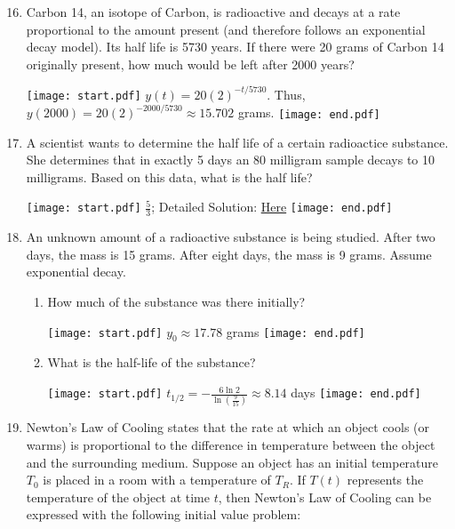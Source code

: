 \documentclass[12pt]{article}
\begin{document}
\begin{enumerate}
\setcounter{enumi}{15}

\item Carbon 14, an isotope of Carbon, is radioactive and decays at a rate proportional to the amount present (and therefore follows an exponential decay model).  Its half life is 5730 years.  If there were 20 grams of Carbon 14 originally present, how much would be left after 2000 years?

\texttt{[image: start.pdf]}
{{$y(t)=20(2)^{-t/5730}$.  Thus, $y(2000)=20(2)^{-2000/5730}\approx 15.702$ grams.}}
\texttt{[image: end.pdf]}


\item A scientist wants to determine the half life of a certain radioactice substance.  She determines that in exactly 5 days an 80 milligram sample decays to 10 milligrams.  Based on this data, what is the half life?

\texttt{[image: start.pdf]}
{{$\frac{5}{3}$; Detailed Solution: \textcolor{blue}{\href{http://www.math.drexel.edu/classes/Calculus/resources/Math122HW/Solutions/122_14_ODE_17.pdf}{Here}}}}
\texttt{[image: end.pdf]}


\item An unknown amount of a radioactive substance is being studied.  After two days, the mass is 15 grams.  After eight days, the mass is 9 grams.  Assume exponential decay.

\begin{enumerate}

\item How much of the substance was there initially?

\texttt{[image: start.pdf]}
{{$y_0\approx 17.78$ grams}}
\texttt{[image: end.pdf]}


\item What is the half-life of the substance?

\texttt{[image: start.pdf]}
{{$t_{1/2}=-\frac{6\ln{2}}{\ln{\left(\frac{9}{15}\right)}}\approx 8.14$ days}}
\texttt{[image: end.pdf]}


\end{enumerate}

\item Newton's Law of Cooling states that the rate at which an object cools (or warms) is proportional to the difference in temperature between the object and the surrounding medium.  Suppose an object has an initial temperature $T_0$ is placed in a room with a temperature of $T_R$.  If $T(t)$ represents the temperature of the object at time $t$, then Newton's Law of Cooling can be expressed with the following initial value problem:


\end{enumerate}
\end{document}
